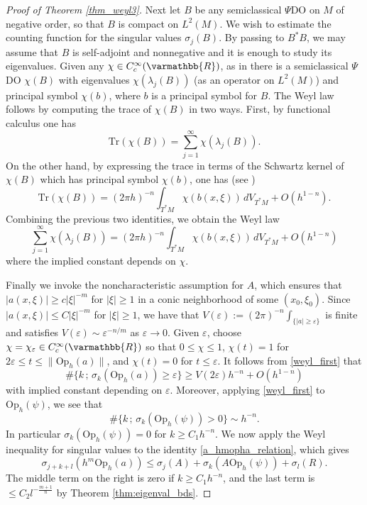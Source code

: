 \documentclass[12pt,twoside]{amsart}
\numberwithin{equation}{section}
\renewcommand{\leq}{\leqslant}
\renewcommand{\geq}{\geqslant}
\renewcommand{\mathbb}{\varmathbb}
\newcommand{\mR}{\mathbb{R}}                    %
\newcommand{\abs}[1]{\lvert #1 \rvert}          %
\newcommand{\norm}[1]{\lVert #1 \rVert}         %
\newcommand{\eps}{\varepsilon}
\begin{document}
\begin{appendix}
\begin{proof}[Proof of Theorem \ref{thm_weyl3}]
Next let $B$ be any semiclassical $\Psi$DO on $M$ of negative order, so that $B$ is compact on $L^2(M)$. We wish to estimate the counting function for the singular values $\sigma_j(B)$. By passing to $B^* B$, we may assume that $B$ is self-adjoint and nonnegative and it is enough to study its eigenvalues. Given any $\chi \in C^{\infty}_c(\mR)$, as in \cite[Section 14.3]{Zworski} there is a semiclassical $\Psi$DO $\chi(B)$ with eigenvalues $\chi(\lambda_j(B))$ (as an operator on $L^2(M)$) and principal symbol $\chi(b)$, where $b$ is a principal symbol for $B$. The Weyl law follows by computing the trace of $\chi(B)$ in two ways. First, by functional calculus one has 
\[
\mathrm{Tr}(\chi(B)) = \sum_{j=1}^{\infty} \chi(\lambda_j(B)).
\]
On the other hand, by expressing the trace in terms of the Schwartz kernel of $\chi(B)$ which has principal symbol $\chi(b)$, one has (see \cite[proof of Theorem 15.3]{Zworski}) 
\[
\mathrm{Tr}(\chi(B)) = (2\pi h)^{-n} \int_{T^* M} \chi(b(x,\xi)) \,dV_{T^* M} + O(h^{1-n}).
\]
Combining the previous two identities, we obtain the Weyl law 
\begin{equation} \label{weyl_first}
\sum_{j=1}^{\infty} \chi(\lambda_j(B))= (2\pi h)^{-n} \int_{T^* M} \chi(b(x,\xi)) \,dV_{T^* M} + O(h^{1-n})
\end{equation}
where the implied constant depends on $\chi$.

Finally we invoke the noncharacteristic assumption for $A$, which ensures that $\abs{a(x,\xi)} \geq c \abs{\xi}^{-m}$ for $\abs{\xi} \geq 1$ in a conic neighborhood of some $(x_0, \xi_0)$. Since $\abs{a(x,\xi)} \leq C \abs{\xi}^{-m}$ for $\abs{\xi} \geq 1$, we have that $V(\eps) := (2\pi)^{-n} \int_{\{\abs{a} \geq \eps \}}$ is finite and satisfies $V(\eps) \sim \eps^{-n/m}$ as $\eps \to 0$. Given $\eps$, choose $\chi = \chi_{\eps} \in C^{\infty}_c(\mR)$ so that $0 \leq \chi \leq 1$, $\chi(t) = 1$ for $2\eps \leq t \leq \norm{\mathrm{Op}_h(a)}$, and $\chi(t) = 0$ for $t \leq \eps$. It follows from \eqref{weyl_first} that 
\[
\# \{ k \,;\, \sigma_k(\mathrm{Op}_h(a)) \geq \eps \} \geq V(2 \eps) h^{-n} + O(h^{1-n})
\]
with implied constant depending on $\eps$. Moreover, applying \eqref{weyl_first} to $\mathrm{Op}_h(\psi)$, we see that 
\[
\# \{ k \,;\, \sigma_k(\mathrm{Op}_h(\psi)) > 0 \} \sim h^{-n}.
\]
In particular $\sigma_k(\mathrm{Op}_h(\psi)) = 0$ for $k \geq C_1 h^{-n}$. We now apply the Weyl inequality for singular values to the identity \eqref{a_hmopha_relation}, which gives 
\begin{equation} \label{sigmajkl_inequality}
\sigma_{j+k+l}(h^m \mathrm{Op}_h(a)) \leq \sigma_j(A) + \sigma_k(A \mathrm{Op}_h(\psi)) + \sigma_l(R).
\end{equation}
The middle term on the right is zero if $k \geq C_1 h^{-n}$, and the last term is $\leq C_2 l^{-\frac{m+1}{n}}$ by Theorem \ref{thm:eigenval_bds}.


\end{proof}
\end{appendix}
\end{document}
